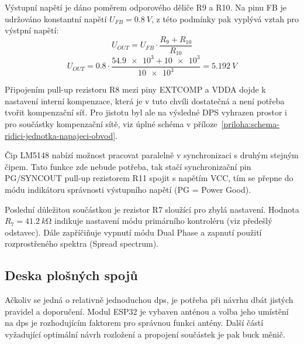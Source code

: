        Výstupní napětí je dáno poměrem odporového děliče R9 a R10. Na pinu FB je udržováno konstantní napětí \(U_{FB} = \qty{0.8}{V}\), z této podmínky pak vyplývá vztah pro výstpní napětí:
        \begin{equation}
            U_{OUT}  = U_{FB}\cdot \frac{R_{9} +R_{10}}{R_{10}}
        \end{equation}
        \begin{equation}
            U_{OUT}  = \num{0.8}\cdot \frac{\num{54.9e3} +\num{10e3}}{\num{10e3}} = \qty{5.192}{V}
        \end{equation}

        Připojením pull-up rezistoru R8 mezi piny EXTCOMP a VDDA dojde k nastavení interní kompenzace, která je v tuto chvíli dostatečná a není potřeba tvořit kompenzační síť. Pro jistotu byl ale na výsledné DPS vyhrazen prostor i pro součástky kompenzační sítě, viz úplné schéma v příloze~\ref{priloha:schema-ridici-jednotka-napajeci-obvod}. 

        Čip LM5148 nabízí možnost pracovat paralelně v synchronizaci s druhým stejným čipem. Tato funkce zde nebude potřeba, tak stačí synchronizační pin PG/SYNCOUT pull-up rezistorem R11 spojit s napětím VCC, tím se přepne do módu indikátoru správnosti výstupního napětí (PG = Power Good). 

        Poslední důležitou součástkou je rezistor R7 sloužící pro zbylá nastavení. Hodnota \(R_{7} = \qty{41.2}{k\ohm}\) indikuje nastavení módu primárního kontroléru (viz předešlý odstavec). Dále zapříčiňuje vypnutí módu Dual Phase a zapnutí použití rozprostřeného spektra (Spread spectrum).


    \subsection{Deska plošných spojů}
        Ačkoliv se jedná o relativně jednoduchou \acs{dps}, je potřeba při návrhu dbát jistých pravidel a doporučení. Modul ESP32 je vybaven anténou a volba jeho umístění na \acs{dps} je rozhodujícím faktorem pro správnou funkci antény. Další částí vyžadující optimální návrh rozložení a propojení součástek je pak buck měnič. 
        
